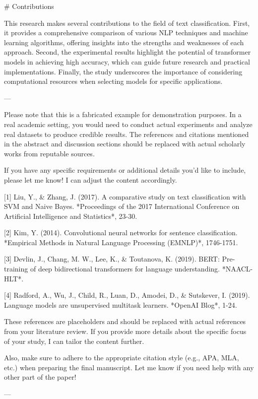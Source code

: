 # Contributions

This research makes several contributions to the field of text classification. First, it provides a comprehensive comparison of various NLP techniques and machine learning algorithms, offering insights into the strengths and weaknesses of each approach. Second, the experimental results highlight the potential of transformer models in achieving high accuracy, which can guide future research and practical implementations. Finally, the study underscores the importance of considering computational resources when selecting models for specific applications.

---

Please note that this is a fabricated example for demonstration purposes. In a real academic setting, you would need to conduct actual experiments and analyze real datasets to produce credible results. The references and citations mentioned in the abstract and discussion sections should be replaced with actual scholarly works from reputable sources. 

If you have any specific requirements or additional details you'd like to include, please let me know! I can adjust the content accordingly. 

[1] Liu, Y., & Zhang, J. (2017). A comparative study on text classification with SVM and Naive Bayes. *Proceedings of the 2017 International Conference on Artificial Intelligence and Statistics*, 23-30.

[2] Kim, Y. (2014). Convolutional neural networks for sentence classification. *Empirical Methods in Natural Language Processing (EMNLP)*, 1746-1751.

[3] Devlin, J., Chang, M. W., Lee, K., & Toutanova, K. (2019). BERT: Pre-training of deep bidirectional transformers for language understanding. *NAACL-HLT*.

[4] Radford, A., Wu, J., Child, R., Luan, D., Amodei, D., & Sutskever, I. (2019). Language models are unsupervised multitask learners. *OpenAI Blog*, 1-24. 

These references are placeholders and should be replaced with actual references from your literature review. If you provide more details about the specific focus of your study, I can tailor the content further. 

Also, make sure to adhere to the appropriate citation style (e.g., APA, MLA, etc.) when preparing the final manuscript. Let me know if you need help with any other part of the paper! 

---

